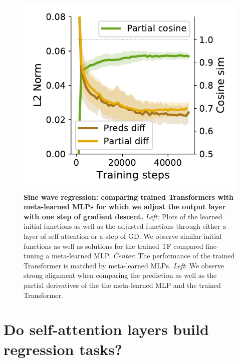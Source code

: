 \documentclass{article}
\theoremstyle{plain}
\theoremstyle{definition}
\theoremstyle{remark}
\begin{document}
\begin{figure}
\begin{center}
\begin{minipage}{.24\textwidth}
\end{minipage}
  \hspace{10pt}
\begin{minipage}{.24\textwidth}
  \centering
  \begin{center}
    \includegraphics[width=1.\textwidth]{Final_figures/non_linear/sim.pdf}
  \end{center}
\end{minipage}
\vspace{-8pt}
  \caption{\textbf{Sine wave regression: comparing trained Transformers with meta-learned MLPs for which we adjust the output layer with one step of gradient descent.} \textit{Left:} Plots of the learned initial functions as well as the adjusted functions through either a layer of self-attention or a step of GD. We observe similar initial functions as well as solutions for the trained TF compared fine-tuning a meta-learned MLP. \textit{Center}: The performance of the trained Transformer is matched by meta-learned MLPs. \textit{Left}: We observe strong alignment when comparing the prediction as well as the partial derivatives of the the meta-learned MLP and the trained Transformer.}
  \label{fig:non_linear}
 \end{center}
 \vspace{-15pt}
\end{figure}
\section{Do self-attention layers build regression tasks?}
\end{document}
